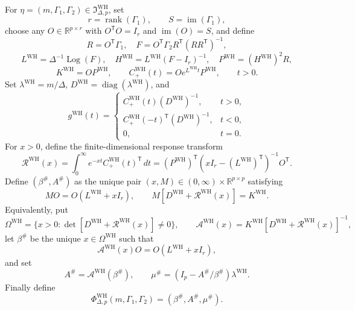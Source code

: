 For \(\eta=(m,\Gamma_1,\Gamma_2)\in\mathfrak I_{\Delta,p}^{\mathrm{WH}}\), set
\[
 r=\operatorname{rank}(\Gamma_1),\qquad S=\operatorname{im}(\Gamma_1),
\]
choose any \(O\in\mathbb R^{p\times r}\) with \(O^{\mathsf T}O=I_r\) and \(\operatorname{im}(O)=S\), and define
\[
 R=O^{\mathsf T}\Gamma_1,\quad
 F=O^{\mathsf T}\Gamma_2R^{\mathsf T}(RR^{\mathsf T})^{-1},
\]
\[
 L^{\mathrm{WH}}=\Delta^{-1}\operatorname{Log}(F),\quad
 H^{\mathrm{WH}}=L^{\mathrm{WH}}(F-I_r)^{-1},\quad
 P^{\mathrm{WH}}=(H^{\mathrm{WH}})^2R,
\]
\[
 K^{\mathrm{WH}}=OP^{\mathrm{WH}},\qquad
 C_{+}^{\mathrm{WH}}(t)=Oe^{L^{\mathrm{WH}}t}P^{\mathrm{WH}},\qquad t>0.
\]
Set \(\lambda^{\mathrm{WH}}=m/\Delta\), \(D^{\mathrm{WH}}=\operatorname{diag}(\lambda^{\mathrm{WH}})\), and
\[
 g^{\mathrm{WH}}(t)=
 \begin{cases}
 C_{+}^{\mathrm{WH}}(t)(D^{\mathrm{WH}})^{-1},&t>0,\\
 C_{+}^{\mathrm{WH}}(-t)^{\mathsf T}(D^{\mathrm{WH}})^{-1},&t<0,\\
 0,&t=0.
 \end{cases}
\]
For \(x>0\), define the finite-dimensional response transform
\[
 \mathcal R^{\mathrm{WH}}(x)
 =\int_0^\infty e^{-xt}C_{+}^{\mathrm{WH}}(t)^{\mathsf T}\,dt
 =(P^{\mathrm{WH}})^{\mathsf T}(xI_r-(L^{\mathrm{WH}})^{\mathsf T})^{-1}O^{\mathsf T}.
\]
Define \((\beta^{\#},A^{\#})\) as the unique pair \((x,M)\in(0,\infty)\times\mathbb R^{p\times p}\) satisfying
\[
 MO=O(L^{\mathrm{WH}}+xI_r),\qquad
 M[D^{\mathrm{WH}}+\mathcal R^{\mathrm{WH}}(x)]=K^{\mathrm{WH}}.
\]
Equivalently, put
\[
 \Omega^{\mathrm{WH}}
 =\{x>0:\det[D^{\mathrm{WH}}+\mathcal R^{\mathrm{WH}}(x)]\neq0\},
\qquad
 \mathcal A^{\mathrm{WH}}(x)
 =K^{\mathrm{WH}}[D^{\mathrm{WH}}+\mathcal R^{\mathrm{WH}}(x)]^{-1},
\]
let \(\beta^{\#}\) be the unique \(x\in\Omega^{\mathrm{WH}}\) such that
\[
 \mathcal A^{\mathrm{WH}}(x)O=O(L^{\mathrm{WH}}+xI_r),
\]
and set
\[
 A^{\#}=\mathcal A^{\mathrm{WH}}(\beta^{\#}),\qquad
 \mu^{\#}=(I_p-A^{\#}/\beta^{\#})\lambda^{\mathrm{WH}}.
\]
Finally define
\[
 \Phi_{\Delta,p}^{\mathrm{WH}}(m,\Gamma_1,\Gamma_2)
 =(\beta^{\#},A^{\#},\mu^{\#}).
\]